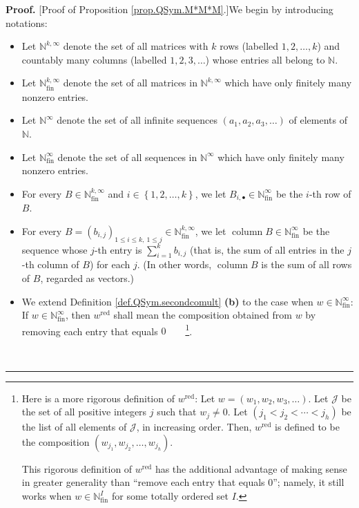 \documentclass
[numbers=enddot,12pt,final,onecolumn,notitlepage,abstracton]{scrartcl}%
\theoremstyle{definition}
\newenvironment{proof}[1][Proof]{\noindent\textbf{#1.} }{\ \rule{0.5em}{0.5em}}
\let\sumnonlimits\sum
\renewcommand{\sum}{\sumnonlimits\limits}
\begin{document}
\begin{proof}
[Proof of Proposition \ref{prop.QSym.M*M*M}.]We begin by introducing notations:

\begin{itemize}
\item Let $\mathbb{N}^{k,\infty}$ denote the set of all matrices with $k$ rows
(labelled $1,2,\ldots,k$) and countably many columns (labelled $1,2,3,\ldots$)
whose entries all belong to $\mathbb{N}$.

\item Let $\mathbb{N}_{\operatorname*{fin}}^{k,\infty}$ denote the set of all
matrices in $\mathbb{N}^{k,\infty}$ which have only finitely many nonzero entries.

\item Let $\mathbb{N}^{\infty}$ denote the set of all infinite sequences
$\left(  a_{1},a_{2},a_{3},\ldots\right)  $ of elements of $\mathbb{N}$.

\item Let $\mathbb{N}_{\operatorname*{fin}}^{\infty}$ denote the set of all
sequences in $\mathbb{N}^{\infty}$ which have only finitely many nonzero entries.

\item For every $B\in\mathbb{N}_{\operatorname*{fin}}^{k,\infty}$ and
$i\in\left\{  1,2,\ldots,k\right\}  $, we let $B_{i,\bullet}\in\mathbb{N}%
_{\operatorname*{fin}}^{\infty}$ be the $i$-th row of $B$.

\item For every $B=\left(  b_{i,j}\right)  _{1\leq i\leq k,\ 1\leq j}%
\in\mathbb{N}_{\operatorname*{fin}}^{k,\infty}$, we let
$\operatorname*{column}B\in\mathbb{N}_{\operatorname*{fin}}^{\infty}$ be the
sequence whose $j$-th entry is $\sum_{i=1}^{k}b_{i,j}$ (that is, the sum of
all entries in the $j$-th column of $B$) for each $j$. (In other words,
$\operatorname*{column}B$ is the sum of all rows of $B$, regarded as vectors.)

\item We extend Definition \ref{def.QSym.secondcomult} \textbf{(b)} to the
case when $w\in\mathbb{N}_{\operatorname*{fin}}^{\infty}$: If $w\in
\mathbb{N}_{\operatorname*{fin}}^{\infty}$, then $w^{\operatorname*{red}}$
shall mean the composition obtained from $w$ by removing each entry that
equals $0$\ \ \ \ \footnote{Here is a more rigorous definition of
$w^{\operatorname*{red}}$: Let $w=\left(  w_{1},w_{2},w_{3},\ldots\right)  $.
Let $\mathcal{J}$ be the set of all positive integers $j$ such that $w_{j}%
\neq0$. Let $\left(  j_{1}<j_{2}<\cdots<j_{h}\right)  $ be the list of all
elements of $\mathcal{J}$, in increasing order. Then, $w^{\operatorname*{red}%
}$ is defined to be the composition $\left(  w_{j_{1}},w_{j_{2}}%
,\ldots,w_{j_{h}}\right)  $.
\par
This rigorous definition of $w^{\operatorname*{red}}$ has the additional
advantage of making sense in greater generality than \textquotedblleft remove
each entry that equals $0$\textquotedblright; namely, it still works when
$w\in\mathbb{N}_{\operatorname*{fin}}^{I}$ for some totally ordered set $I$.}.


\end{itemize}
\end{proof}
\end{document}
